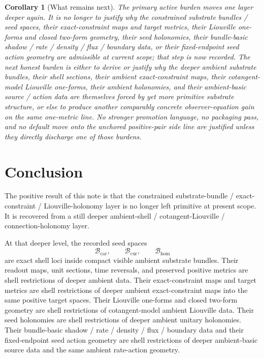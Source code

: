 \documentclass[11pt]{article}
\newcommand{\TensorSeedSpace}{\mathcal B_{\mathrm{car}}}
\newcommand{\CurSeedSpace}{\mathcal B_{\mathrm{cur}}}
\newcommand{\HomSeedSpace}{\mathcal B_{\mathrm{hom}}}
\newtheorem{corollary}{Corollary}
\begin{document}
\begin{corollary}[What remains next]
\label{cor:what_next}
The primary active burden moves one layer deeper again. It is no longer to justify why the constrained substrate bundles / seed spaces, their exact-constraint maps and target metrics, their Liouville one-forms and closed two-form geometry, their seed holonomies, their bundle-basic shadow / rate / density / flux / boundary data, or their fixed-endpoint seed action geometry are admissible at current scope; that step is now recorded. The next honest burden is either to derive or justify why the deeper ambient substrate bundles, their shell sections, their ambient exact-constraint maps, their cotangent-model Liouville one-forms, their ambient holonomies, and their ambient-basic source / action data are themselves forced by yet more primitive substrate structure, or else to produce another comparably concrete observer-equation gain on the same one-metric line. No stronger promotion language, no packaging pass, and no default move onto the anchored positive-pair side line are justified unless they directly discharge one of those burdens.
\end{corollary}

\section{Conclusion}

The positive result of this note is that the constrained substrate-bundle / exact-constraint / Liouville-holonomy layer is no longer left primitive at present scope. It is recovered from a still deeper ambient-shell / cotangent-Liouville / connection-holonomy layer.

At that deeper level, the recorded seed spaces
\[
\TensorSeedSpace,\qquad
\CurSeedSpace,\qquad
\HomSeedSpace
\]
are exact shell loci inside compact visible ambient substrate bundles. Their readout maps, unit sections, time reversals, and preserved positive metrics are shell restrictions of deeper ambient data. Their exact-constraint maps and target metrics are shell restrictions of deeper ambient exact-constraint maps into the same positive target spaces. Their Liouville one-forms and closed two-form geometry are shell restrictions of cotangent-model ambient Liouville data. Their seed holonomies are shell restrictions of deeper ambient unitary holonomies. Their bundle-basic shadow / rate / density / flux / boundary data and their fixed-endpoint seed action geometry are shell restrictions of deeper ambient-basic source data and the same ambient rate-action geometry.
\end{document}
